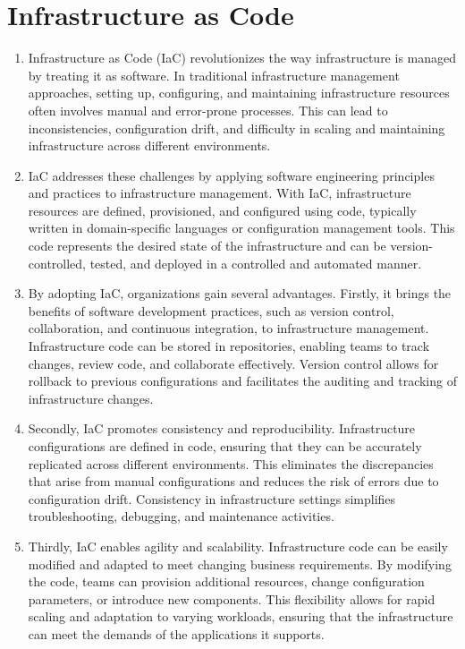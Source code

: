 \section*{Infrastructure as Code}

\begin{enumerate}
    \item Infrastructure as Code (IaC) revolutionizes the way infrastructure is managed by treating it as software. In traditional infrastructure management approaches, setting up, configuring, and maintaining infrastructure resources often involves manual and error-prone processes. This can lead to inconsistencies, configuration drift, and difficulty in scaling and maintaining infrastructure across different environments.

    \item IaC addresses these challenges by applying software engineering principles and practices to infrastructure management. With IaC, infrastructure resources are defined, provisioned, and configured using code, typically written in domain-specific languages or configuration management tools. This code represents the desired state of the infrastructure and can be version-controlled, tested, and deployed in a controlled and automated manner.

    \item By adopting IaC, organizations gain several advantages. Firstly, it brings the benefits of software development practices, such as version control, collaboration, and continuous integration, to infrastructure management. Infrastructure code can be stored in repositories, enabling teams to track changes, review code, and collaborate effectively. Version control allows for rollback to previous configurations and facilitates the auditing and tracking of infrastructure changes.

    \item Secondly, IaC promotes consistency and reproducibility. Infrastructure configurations are defined in code, ensuring that they can be accurately replicated across different environments. This eliminates the discrepancies that arise from manual configurations and reduces the risk of errors due to configuration drift. Consistency in infrastructure settings simplifies troubleshooting, debugging, and maintenance activities.

    \item Thirdly, IaC enables agility and scalability. Infrastructure code can be easily modified and adapted to meet changing business requirements. By modifying the code, teams can provision additional resources, change configuration parameters, or introduce new components. This flexibility allows for rapid scaling and adaptation to varying workloads, ensuring that the infrastructure can meet the demands of the applications it supports.


\end{enumerate}
